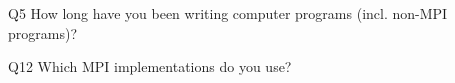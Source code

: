 \begin{description}%
\item{Q5} How long have you been writing computer programs (incl. non-MPI programs)?%
\item{Q12} Which MPI implementations do you use?%
\end{description}%
